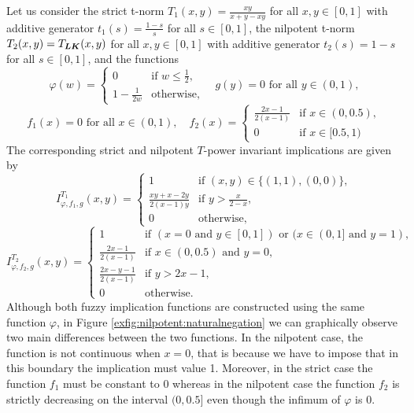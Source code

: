 \begin{example}\label{example:nilpotent:naturalnegation} Let us consider the strict t-norm $T_1(x,y)=\frac{xy}{x+y-xy}$ for all $x,y \in [0,1]$ with additive generator $t_1(s)=\frac{1-s}{s}$ for all $s \in [0,1]$, the nilpotent t-norm $T_2(x,y)=T_{\bm{LK}}(x,y)$ for all $x,y \in [0,1]$ with additive generator $t_2(s)=1-s$ for all $s \in [0,1]$, and the functions
	$$\varphi(w)= \left\{ \begin{array}{ll}
		0 &   \text{if }   w \leq \frac{1}{2}, \\
		1-\frac{1}{2w} &  \text{otherwise}, 	\end{array}
	\right. \quad g(y)=0 \text{ for all } y \in(0,1),
	$$
	$$f_1(x)=0 \text{ for all } x \in (0,1), 
	\quad 
	f_2(x)=
	\left\{ \begin{array}{ll}
		\frac{2x-1}{2(x-1)} & \text{if } x \in (0,0.5),\\
		0 & \text{if } x \in [0.5,1)
	\end{array}
	\right.
	$$
	The corresponding strict and nilpotent $T$-power invariant implications are given by
	$$
		I_{\varphi,f_1,g}^{T_1}(x,y) =\left\{ \begin{array}{ll}
			1 & \text{if } (x,y) \in \{(1,1),(0,0)\},\\
			\frac{xy+x-2y}{2(x-1)y} &  \text{if } y> \frac{x}{2-x},\\
			0 & \text{otherwise,}
		\end{array}
		\right.
	$$
	$$
		I_{\varphi,f_2,g}^{T_2}(x,y) =\left\{ \begin{array}{ll}
			1 & \text{if } (x=0 \text{ and } y \in [0,1]) \text{ or } (x \in (0,1] \text{ and } y=1),\\
			\frac{2x-1}{2(x-1)} &   \text{if }   x \in (0,0.5) \text{ and } y=0, \\
			\frac{2x-y-1}{2(x-1)} &  \text{if } y>2x-1,\\
			0 & \text{otherwise.}
		\end{array}
		\right.
	$$
	Although both fuzzy implication functions are constructed using the same function $\varphi$, in Figure \ref{exfig:nilpotent:naturalnegation} we can graphically observe two main differences between the two functions. In the nilpotent case, the function is not continuous when $x=0$, that is because we have to impose that in this boundary the implication must value 1. Moreover, in the strict case the function $f_1$ must be constant to 0 whereas in the nilpotent case the function $f_2$ is strictly decreasing on the interval $(0,0.5]$ even though the infimum of $\varphi$ is 0.
	

\end{example}

